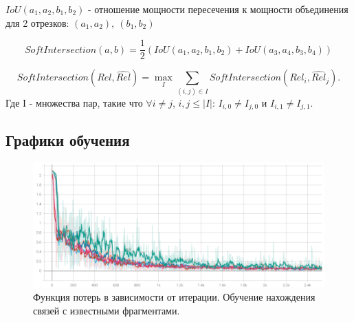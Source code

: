 \documentclass[12pt]{article}
\begin{document}
\begin{center}
\end{center}

$IoU(a_1, a_2, b_1, b_2)$ - отношение мощности пересечения к мощности объединения для 2 отрезков: $(a_1, a_2),~(b_1, b_2)$

$$
SoftIntersection(a, b) = 
\frac{1}{2} (IoU(a_1, a_2, b_1, b_2) + IoU(a_3, a_4, b_3, b_4))
$$

$$
SoftIntersection(Rel, \hat{Rel}) = \max_{I} \sum_{(i, j) \in I} SoftIntersection(Rel_i, \hat{Rel}_j).
$$
Где I - множества пар, такие что $\forall i \neq j$, $i, j \leq |I|$: $I_{i, 0} \neq I_{j, 0}$ и $I_{i, 1} \neq I_{j, 1}$.


\begin{center}
\end{center}


\subsection{Графики обучения}

\begin{figure}[h]
    \centering
    \includegraphics[width=\textwidth]{loss.png}
    \caption{Функция потерь в зависимости от итерации. Обучение нахождения связей с известными фрагментами.}
    \label{fig:loss_clf}
\end{figure}
\end{document}
